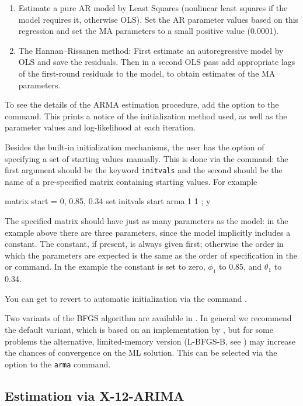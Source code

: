 \begin{enumerate}
\item Estimate a pure AR model by Least Squares (nonlinear least
  squares if the model requires it, otherwise OLS).  Set the AR
  parameter values based on this regression and set the MA
  parameters to a small positive value (0.0001).
\item The Hannan--Rissanen method: First estimate an autoregressive
  model by OLS and save the residuals.  Then in a second OLS pass add
  appropriate lags of the first-round residuals to the model, to
  obtain estimates of the MA parameters.
\end{enumerate}

To see the details of the ARMA estimation procedure, add the
 option to the command.  This prints a notice of the
initialization method used, as well as the parameter values and
log-likelihood at each iteration.

Besides the built-in initialization mechanisms, the user has the
option of specifying a set of starting values manually.  This is done
via the  command: the first argument should be the keyword
\texttt{initvals} and the second should be the name of a pre-specified
matrix containing starting values.  For example
\begin{code}
matrix start = { 0, 0.85, 0.34 }
set initvals start
arma 1 1 ; y
\end{code}
The specified matrix should have just as many parameters as the model:
in the example above there are three parameters, since the model
implicitly includes a constant.  The constant, if present, is always
given first; otherwise the order in which the parameters are
expected is the same as the order of specification in the 
or  command.  In the example the constant is set to zero,
$\phi_1$ to 0.85, and $\theta_1$ to 0.34.

You can get  to revert to automatic initialization via
the command .

Two variants of the BFGS algorithm are available in .  In
general we recommend the default variant, which is based on an
implementation by \cite{nash90}, but for some problems the
alternative, limited-memory version (L-BFGS-B, see
\citealp{byrd-etal95}) may increase the chances of convergence on the
ML solution.  This can be selected via the  option to
the \texttt{arma} command.

\subsection{Estimation via X-12-ARIMA}

